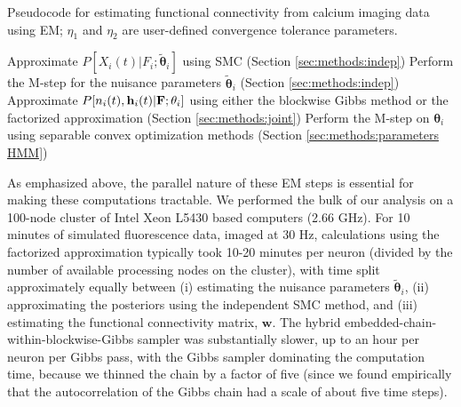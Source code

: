 \documentclass[aoas,preprint]{imsart}
\newcommand{\bth}{\mathbf{\theta}}
\newcommand{\w}{w}
\newcommand{\bw}{\mathbf{\w}}
\newcommand{\bF}{{\bf F}}
\newcommand{\bh}{\mathbf{h}}
\newcommand{\tbth}{\tilde{\bth}}
\begin{document}
\begin{algorithm}[t!]
\caption{Pseudocode for estimating functional connectivity from
calcium imaging data using EM; $\eta_1$ and $\eta_2$ are
user-defined convergence tolerance parameters.}
\label{eqn:pseudocode}
\begin{algorithmic}
\While{$|{\bw}^{(l)}-{\bw}^{(l-1)}|>\eta_1$}
    \While{$|{\tbth_i}^{(l)}-{\tbth_i}^{(l-1)}|> \eta_2$}
      \State Approximate $P[X_i(t)|F_i; \tbth_i]$ using SMC (Section \ref{sec:methods:indep})
      \State Perform the M-step for the nuisance parameters $\tbth_i$ (Section \ref{sec:methods:indep})
    \EndWhile
  \EndFor
      \State Approximate $P[n_i(t), \bh_i(t) |\bF; \bth_i]$ using either the blockwise Gibbs
      \State method or the factorized approximation (Section \ref{sec:methods:joint})
    \EndFor
  	\State Perform the M-step on $\bth_i$ using separable convex optimization methods (Section \ref{sec:methods:parameters HMM})
  \EndFor
\EndWhile
\end{algorithmic}
\end{algorithm}

As emphasized above, the parallel nature of these EM steps is essential for making these computations tractable. We performed the bulk of our analysis on a 100-node cluster of Intel Xeon L5430 based computers (2.66 GHz). For 10 minutes of simulated fluorescence data, imaged at $30$ Hz, calculations using the factorized approximation typically took 10-20 minutes per neuron (divided by the number of available processing nodes on the cluster), with time split approximately equally between (i) estimating the nuisance parameters $\tbth_i $, (ii) approximating the posteriors using the independent SMC method, and (iii) estimating the functional connectivity matrix, $\bw$. The hybrid embedded-chain-within-blockwise-Gibbs sampler was substantially slower, up to an hour per neuron per Gibbs pass, with the Gibbs sampler dominating the computation time, because we thinned the chain by a factor of five (since we found empirically that the autocorrelation of the Gibbs chain had a scale of about five time steps).
\end{document}
